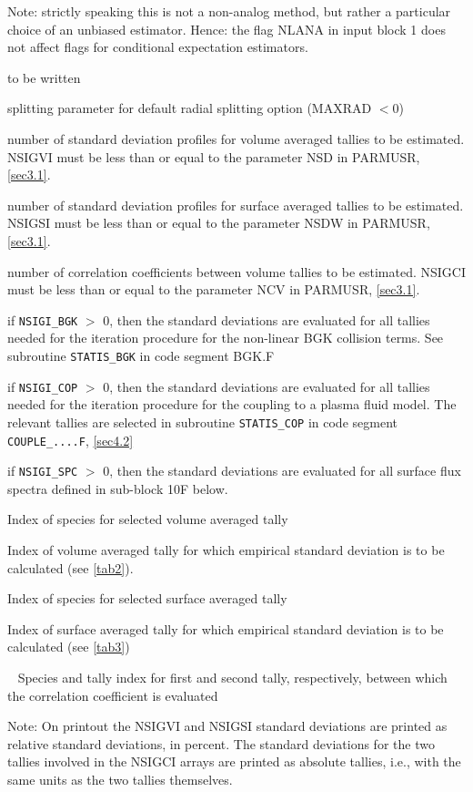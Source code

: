 \begin{description}
        Note: strictly speaking this is not a non-analog method, but rather a
        particular choice of an unbiased estimator.
        Hence: the flag NLANA in input block 1 does not affect flags for conditional
        expectation estimators.
  \item[WMINL] to be written 

  \item[SPLPAR] splitting parameter for default radial splitting option (MAXRAD
        $<0$)
  \item[NSIGVI] number of standard deviation profiles for volume averaged
        tallies to be estimated.
        NSIGVI must be less than or equal to the parameter NSD in PARMUSR,
        \cref{sec3.1}.
  \item[NSIGSI] number of standard deviation profiles for surface averaged
        tallies to be estimated.
        NSIGSI must be less than or equal to the parameter NSDW in PARMUSR,
        \cref{sec3.1}.
  \item[NSIGCI] number of correlation coefficients between volume tallies to be
        estimated.
        NSIGCI must be less than or equal to the parameter NCV in PARMUSR,
        \cref{sec3.1}.
  \item[NSIGI\_BGK] if \lstinline|NSIGI_BGK| $>$ 0, then the standard deviations
        are evaluated for all tallies needed for the iteration procedure for the
        non-linear \ac{BGK} collision terms.
        See subroutine \lstinline|STATIS_BGK| in code segment BGK.F
  \item[NSIGI\_COP]
        if \lstinline|NSIGI_COP| $>$ 0, then the standard deviations are evaluated for
        all tallies needed for the iteration procedure for the coupling to a plasma
        fluid model.
        The relevant tallies are selected in subroutine \lstinline|STATIS_COP| in code
        segment \lstinline|COUPLE_....F|, \cref{sec4.2}
  \item[NSIGI\_SPC] if
        \lstinline|NSIGI_SPC| $>$ 0, then the standard deviations are evaluated for
        all surface flux spectra defined in sub-block 10F below.
  \item[IGH] Index of species for selected volume averaged tally
  \item[IIH] Index
        of volume averaged tally for which empirical standard deviation is to be
        calculated (see \cref{tab2}).
  \item[IGHW] Index of species for selected surface averaged tally
  \item[IIHW]
        Index of surface averaged tally for which empirical standard deviation is to be
        calculated (see \cref{tab3})
  \item[IGHC1 IIHC1 IGHC2 IIHC2]~ Species and tally
        index for first and second tally, respectively, between which the correlation
        coefficient is evaluated
\end{description}

Note: On printout the NSIGVI and NSIGSI standard deviations are printed as
relative standard deviations, in percent.
The standard deviations for the two tallies involved in the NSIGCI arrays are
printed as absolute tallies, i.e., with the same units as the two tallies
themselves.
